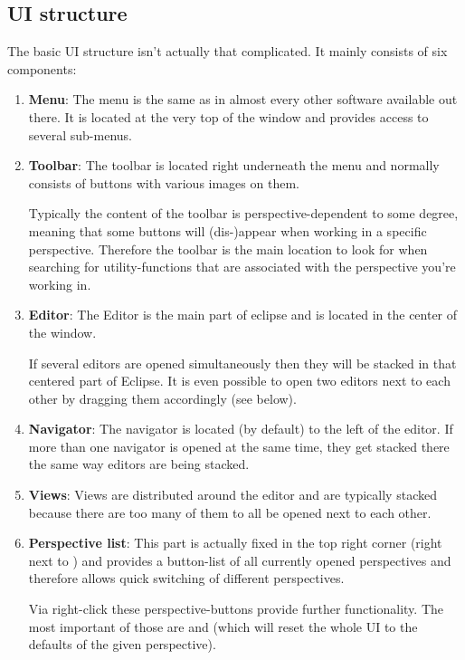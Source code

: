\documentclass[twoside=false]{scrbook}
\newcommand{\eclipse}{Eclipse\xspace}
\begin{document}
	\subsection{UI structure}
	The basic UI structure isn't actually that complicated. It mainly consists of six components:
	\begin{enumerate}
		\item \textbf{Menu}: The menu is the same as in almost every other software available out there. It is located at the very top of the window and provides access to several sub-menus.
		
		\item \textbf{Toolbar}: The toolbar is located right underneath the menu and normally consists of buttons with various images on them.
		
		Typically the content of the toolbar is perspective-dependent to some degree, meaning that some buttons will (dis-)appear when working in a specific perspective. Therefore the toolbar is the main location to look for when searching for utility-functions that are associated with the perspective you're working in.
		
		\item \textbf{Editor}: The Editor is the main part of eclipse and is located in the center of the window.
		
		If several editors are opened simultaneously then they will be stacked in that centered part of \eclipse. It is even possible to open two editors next to each other by dragging them accordingly (see below).
		
		\item \textbf{Navigator}: The navigator is located (by default) to the left of the editor. If more than one navigator is opened at the same time, they get stacked there the same way editors are being stacked.
		
		\item \textbf{Views}: Views are distributed around the editor and are typically stacked because there are too many of them to all be opened next to each other.
		
		\item \textbf{Perspective list}: This part is actually fixed in the top right corner (right next to ) and provides a button-list of all currently opened perspectives and therefore allows quick switching of different perspectives.
		
		Via right-click these perspective-buttons provide further functionality. The most important of those are  and  (which will reset the whole UI to the defaults of the given perspective).
	\end{enumerate}
	
\end{document}

